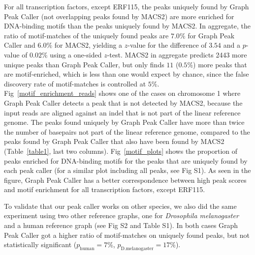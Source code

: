 \documentclass[10pt,letterpaper]{article}
\begin{document}
For all transcription factors, except ERF115, the peaks uniquely found by Graph Peak Caller (not overlapping peaks found by MACS2) are more enriched for DNA-binding motifs than the peaks uniquely found by MACS2. In aggregate, the ratio of motif-matches of the uniquely found peaks are $7.0\%$ for Graph Peak Caller and $6.0\%$ for MACS2, yielding a $z$-value for the difference of $3.54$ and a $p$-value of $0.02\%$ using a one-sided $z$-test. MACS2 in aggregate predicts 2443 more unique peaks than Graph Peak Caller, but only finds $11$ ($0.5\%$) more peaks that are motif-enriched, which is less than one would expect by chance, since the false discovery rate of motif-matches is controlled at $5\%$. Fig~\ref{motif_enrichment_reads} shows one of the cases on chromosome 1 where Graph Peak Caller detects a peak that is not detected by MACS2, because the input reads are aligned against an indel that is not part of the linear reference genome. The peaks found uniquely by Graph Peak Caller have more than twice the number of basepairs not part of the linear reference genome, compared to the peaks found by Graph Peak Caller that also have been found by MACS2 (Table~\ref{table1}, last two columns). Fig~\ref{motif_plots} shows the proportion of peaks enriched for DNA-binding motifs for the peaks that are uniquely found by each peak caller (for a similar plot including all peaks, see Fig S1). As seen in the figure, Graph Peak Caller has a better correspondence between high peak scores and motif enrichment for all transcription factors, except ERF115. 


To validate that our peak caller works on other species, we also did the same experiment using two other reference graphs, one for \emph{Drosophila melanogaster } and a human reference graph (see Fig S2 and Table S1). In both cases Graph Peak Caller got a higher ratio of motif-matches on uniquely found peaks, but not statistically significant ($p_{\text{human}}=7\%$, $p_{\text{D.melanogaster}}=17\%$).
\end{document}
